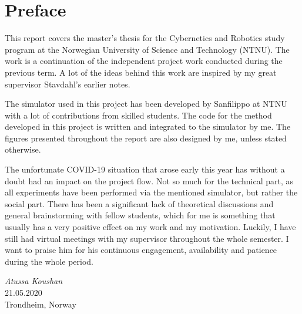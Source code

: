 \chapter{Preface}

This report covers the master's thesis for the Cybernetics and Robotics study program at the Norwegian University of Science and Technology (NTNU). The work is a continuation of the independent project work conducted during the previous term. A lot of the ideas behind this work are inspired by my great supervisor Stavdahl's earlier notes.

The simulator used in this project has been developed by Sanfilippo at NTNU with a lot of contributions from skilled students. The code for the method developed in this project is written and integrated to the simulator by me. The figures presented throughout the report are also designed by me, unless stated otherwise.

The unfortunate COVID-19 situation that arose early this year has without a doubt had an impact on the project flow. Not so much for the technical part, as all experiments have been performed via the mentioned simulator, but rather the social part. There has been a significant lack of theoretical discussions and general brainstorming with fellow students, which for me is something that usually has a very positive effect on my work and my motivation. Luckily, I have still had virtual meetings with my supervisor throughout the whole semester.
I want to praise him for his continuous engagement, availability and patience during the whole period.


\medskip
\begin {flushright}
  \textit{Atussa Koushan} \\
  \textsc {21.05.2020} \\
  Trondheim, Norway
\end {flushright}



\makeatletter
{}


\makeatother




